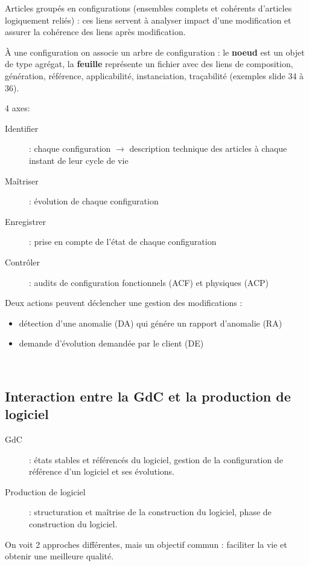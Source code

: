Articles groupés en configurations (ensembles complets et cohérents d’articles logiquement reliés) : ces liens servent à analyser impact d’une modification et assurer la cohérence des liens après modification.

À une configuration on associe un arbre de configuration : le \textbf{noeud} est un objet de type agrégat, la \textbf{feuille} représente un fichier avec des liens de composition, génération, référence, applicabilité, instanciation, traçabilité (exemples slide 34 à 36).

4 axes:

	\begin{description}
	\item[Identifier] : chaque configuration $\rightarrow$ description technique des articles à chaque instant de leur cycle de vie
	\item[Maîtriser] : évolution de chaque configuration
	\item[Enregistrer] : prise en compte de l’état de chaque configuration
	\item[Contrôler] : audits de configuration fonctionnels (ACF) et physiques (ACP)
	\end{description}

Deux actions peuvent déclencher une gestion des modifications :

	\begin{itemize}
	\item détection d’une anomalie (DA) qui génére un rapport d’anomalie (RA)
	\item demande d’évolution demandée par le client (DE)
	\end{itemize}
	\hfill\\

	\subsection{Interaction entre la GdC et la production de logiciel}

\begin{description}
	\item[GdC] : états stables et référencés du logiciel, gestion de la configuration de référence d’un logiciel et ses évolutions.
	\item[Production de logiciel] : structuration et maîtrise de la construction du logiciel, phase de construction du logiciel.
\end{description}

On voit 2 approches différentes, mais un objectif commun : faciliter la vie et obtenir une meilleure qualité.

